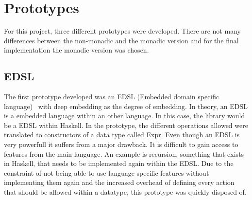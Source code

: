 \chapter{Prototypes}
\label{chapter:prototypes}
For this project, three different prototypes were developed. There are not many differences between the non-monadic and the monadic version and for the final implementation the monadic version was chosen.
\section{EDSL}
The first prototype developed was an EDSL (Embedded domain specific language)~\cite{haskell_edsl} with deep embedding as the degree of embedding. In theory, an EDSL is a embedded language within an other language. In this case, the library would be a EDSL within Haskell. In the prototype, the different operations allowed were translated to constructors of a data type called Expr. Even though an EDSL is very powerfull it suffers from a major drawback. It is difficult to gain access to features from the main language. An example is recursion, something that exists in Haskell, that needs to be implemented again within the EDSL. Due to the constraint of not being able to use language-specific features without implementing them again and the increased overhead of defining every action that should be allowed within a datatype, this prototype was quickly disposed of.

